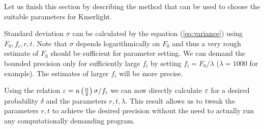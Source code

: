 \medskip

Let us finish this section by describing the method that can be used to choose the suitable parameters for Kmerlight.

Standard deviation $\sigma$ can be calculated by the equation (\ref{eq:variance})
using $F_0, f_i, r, t$. Note that $\sigma$ depends logarithmically on $F_0$
and thus a very rough estimate of $F_0$ should be sufficient for parameter setting. 
We can demand the bounded precision only for sufficiently large $f_i$ by setting 
$f_i = F_0/\lambda$ ($\lambda=1000$ for example). The estimates of larger $f_i$ will be more precise.

Using the relation $\varepsilon = u\left(\frac{\alpha}{2}\right)\sigma/f_i$ we can now directly
calculate $\varepsilon$ for a desired probability $\delta$ and the parameters $r, t, \lambda$.
This result allows us to tweak the parameters $r, t$ to achieve the desired precision
without the need to actually run any computationally demanding program.
